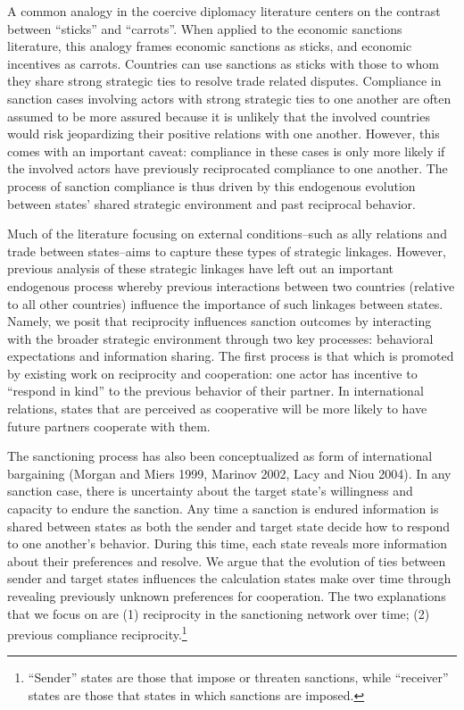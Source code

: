 A common analogy in the coercive diplomacy literature centers on the contrast between ``sticks'' and ``carrots''. When applied to the economic sanctions literature, this analogy frames economic sanctions as sticks, and economic incentives as carrots. Countries can use sanctions as sticks with those to whom they share strong strategic ties to resolve trade related disputes.  Compliance in sanction cases involving actors with strong strategic ties to one another are often assumed to be more assured because it is unlikely that the involved countries would risk jeopardizing their positive relations with one another. However, this comes with an important caveat: compliance in these cases is only more likely if the involved actors have previously reciprocated compliance to one another.  The process of sanction compliance is thus driven by this endogenous evolution between states' shared strategic environment and past reciprocal behavior.

Much of the literature focusing on external conditions--such as ally relations and trade between states--aims to capture these types of strategic linkages. However, previous analysis of these strategic linkages have left out an important endogenous process whereby previous interactions between two countries (relative to all other countries) influence the importance of such linkages between states. Namely, we posit that reciprocity influences sanction outcomes by interacting with the broader strategic environment through two key processes: behavioral expectations and information sharing. The first process is that which is promoted by existing work on reciprocity and cooperation: one actor has incentive to ``respond in kind'' to the previous behavior of their partner. In international relations, states that are perceived as cooperative will be more likely to have future partners cooperate with them.

The sanctioning process has also been conceptualized as form of international bargaining (Morgan and Miers 1999, Marinov 2002, Lacy and Niou 2004). In any sanction case, there is uncertainty about the target state's willingness and capacity to endure the sanction.  Any time a sanction is endured information is shared between states as both the sender and target state decide how to respond to one another's behavior. During this time, each state reveals more information about their preferences and resolve.  We argue that the evolution of ties between sender and target states influences the calculation states make over time through revealing previously unknown preferences for cooperation. The two explanations that we focus on are (1) reciprocity in the sanctioning network over time; (2) previous compliance reciprocity.\footnote{``Sender'' states are those that impose or threaten sanctions, while ``receiver'' states are those that states in which sanctions are imposed.}

